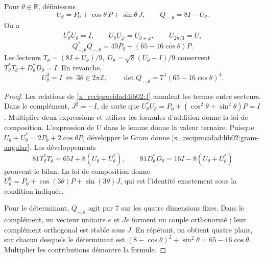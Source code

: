 \begin{theorem}
\label{x_reciprocidad:lib02:Utheta}
Pour \(\theta\in\mathbb R\), définissons
\[
 U_\theta=P_0+\cos\theta\,P+\sin\theta\,J,\qquad
 Q_{-,\theta}=8I-U_\theta.
\]
On a
\[
 U_\theta^*U_\theta=I,\qquad
 U_\theta U_\varphi=U_{\theta+\varphi},\qquad U_{2\pi/3}=U,
\]
\begin{equation}
 Q_{-,\theta}^*Q_{-,\theta}
 =49P_0+(65-16\cos\theta)P.
 \label{x_reciprocidad:lib02:gram-angular}
\end{equation}
Les lecteurs \(T_\theta=(8I+U_\theta)/9\), \(D_\theta=\sqrt8(U_\theta-I)/9\) conservent \(T_\theta^*T_\theta+D_\theta^*D_\theta=I\). En revanche,
\[
 U_\theta^3=I\ \Longleftrightarrow\ 3\theta\in2\pi\mathbb Z,
 \qquad
 \det Q_{-,\theta}=7^4(65-16\cos\theta)^4.
\]
\end{theorem}
\begin{proof}
Les relations de \cref{x_reciprocidad:lib02:J} annulent les termes entre secteurs.
Dans le complément, \(J^2=-I\), de sorte que
\(U_\theta^*U_\theta=P_0+(\cos^2\theta+\sin^2\theta)P=I\).
Multiplier deux expressions et utiliser les formules d’addition donne la
loi de composition. L’expression de \(U\) dans le lemme donne la valeur
ternaire. Puisque
\(U_\theta+U_\theta^*=2P_0+2\cos\theta P\), développer le
Gram donne \eqref{x_reciprocidad:lib02:gram-angular}. Les développements
\[
 81T_\theta^*T_\theta=65I+8(U_\theta+U_\theta^*),\qquad
 81D_\theta^*D_\theta=16I-8(U_\theta+U_\theta^*)
\]
prouvent le bilan. La loi de composition donne \(U_\theta^3=P_0+\cos(3\theta)P+\sin(3\theta)J\), qui est l'identité exactement sous la condition indiquée.

Pour le déterminant, \(Q_{-,\theta}\) agit par 7 sur les quatre
dimensions fixes. Dans le complément, un vecteur unitaire \(e\) et
\(Je\) forment un couple orthonormé ; leur complément orthogonal est stable
sous \(J\). En répétant, on obtient quatre plans, sur chacun
desquels le déterminant est
\((8-\cos\theta)^2+\sin^2\theta=65-16\cos\theta\).
Multiplier les contributions démontre la formule.
\end{proof}

